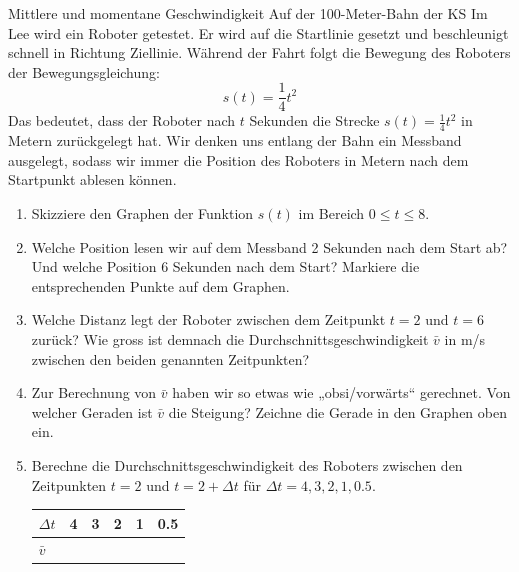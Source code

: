 \begin{LA}
    {Mittlere und momentane Geschwindigkeit}{}
    Auf der 100-Meter-Bahn der KS Im Lee wird ein Roboter getestet. Er wird auf die Startlinie gesetzt und beschleunigt schnell in Richtung Ziellinie. Während der Fahrt folgt die Bewegung des Roboters der Bewegungsgleichung:
\[
    s(t) = \frac{1}{4} t^2
\]
Das bedeutet, dass der Roboter nach $t$ Sekunden die Strecke $s(t) = \frac{1}{4} t^2$ in Metern zurückgelegt hat. Wir denken uns entlang der Bahn ein Messband ausgelegt, sodass wir immer die Position des Roboters in Metern nach dem Startpunkt ablesen können.
\begin{enumerate}
    \item Skizziere den Graphen der Funktion $s(t)$ im Bereich $0 \leq t \leq 8$.

 

\begin{center}
\end{center}


    \item Welche Position lesen wir auf dem Messband 2 Sekunden nach dem Start ab? Und welche Position 6 Sekunden nach dem Start? Markiere die entsprechenden Punkte auf dem Graphen.
    \item Welche Distanz legt der Roboter zwischen dem Zeitpunkt $t=2$ und $t=6$ zurück? Wie gross ist demnach die Durchschnittsgeschwindigkeit $\bar{v}$ in m/s zwischen den beiden genannten Zeitpunkten?
    \item Zur Berechnung von $\bar{v}$ haben wir so etwas wie „obsi/vorwärts“ gerechnet. Von welcher Geraden ist $\bar{v}$ die Steigung? Zeichne die Gerade in den Graphen oben ein.
    \item Berechne die Durchschnittsgeschwindigkeit des Roboters zwischen den Zeitpunkten $t=2$ und $t=2+\Delta t$ für $\Delta t=4,3,2,1,0.5$.
    \begin{center}
        \begin{tabular}{p{1.5cm} p{1.5cm} p{1.5cm} p{1.5cm} p{1.5cm} p{1.5cm}}
            \hline
            $\Delta t$ & 4 & 3 & 2 & 1 & 0.5 \\
            \hline
            $\bar{v}$ &  &  & &  &  \\
            \hline
                

\end{tabular}
\end{center}
\end{enumerate}
\end{LA}
